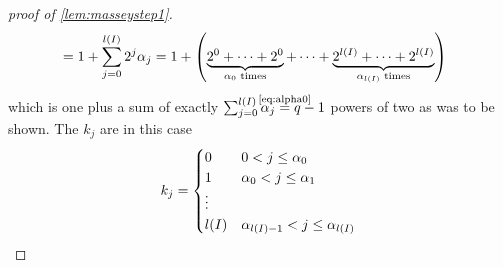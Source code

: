 \begin{proof}[proof of \autoref{lem:masseystep1}]
\begin{align*}
    &= 1 + \sum_{j=0}^{l(I)}2^j\alpha_j
    = 1 + \left(
      \underbrace{2^0 +\dotsb+ 2^0}_{\text{$\alpha_0$ times}}
      + \dotsb
      + \underbrace{2^{l(I)}+\dotsb+2^{l(I)}}_{\text{$\alpha_{l(I)}$ times}}
      \right)
  \end{align*}
  which is one plus a sum of exactly
  $\sum_{j=0}^{\l(I)}\alpha_j\cequalsby{\eqref{eq:alpha0}} q-1$
  powers of two as was to be shown.
  The $k_j$ are in this case
  \begin{gather*}
    k_j = \begin{cases}
      0 & 0< j\leq \alpha_0\\
      1 & \alpha_0< j\leq \alpha_1\\
      \vdots\\
      l(I) & \alpha_{l(I)-1}<j\leq \alpha_{l(I)}
    \end{cases}
    \qedhere
  \end{gather*}
\end{proof}


